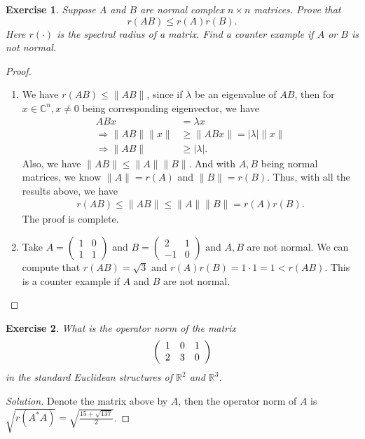 \documentclass[11pt]{book}
\newtheorem{exercise}{Exercise}[section]
\theoremstyle{definition}
\numberwithin{equation}{chapter}
\begin{document}
\medskip

\begin{exercise}
Suppose $A$ and $B$ are normal complex $n\times n$ matrices. Prove that%
$$
r(AB)\leq r(A)r(B).
$$
Here $r(\cdot)$ is the spectral radius of a matrix. Find a counter example if
$A$ or $B$ is not normal.
\end{exercise}
\begin{proof}
~\begin{enumerate}[label=(\alph*)]
    \item We have $r(AB)\leq \|AB\|$, since if $\lambda$ be an eigenvalue of $AB$, then for $x\in\mathbb{C}^n, x\neq 0$ being corresponding eigenvector, we have 
    \begin{align*}
        AB x & = \lambda x \\
        \Rightarrow \|AB\|\|x\| & \geq \|AB x\| = |\lambda|\|x\| \\
        \Rightarrow \|AB\| & \geq |\lambda|.
    \end{align*}
    Also, we have $\|AB\|\leq \|A\| \|B\|$. And with $A, B$ being normal matrices, we know $\|A\| = r(A)$ and $\|B\| = r(B)$. Thus, with all the results above, we have 
    \begin{align*}
        r(AB)\leq \|AB\|\leq \|A\| \|B\| = r(A)r(B).
    \end{align*}
    The proof is complete. 
    \item Take $A = \left(
    \begin{matrix}
        1 & 0\\
        1 & 1
        \end{matrix}
    \right)$ and $B = \left(
    \begin{matrix}
        2 & 1\\
        -1 & 0
    \end{matrix}
    \right)$ and $A,B$ are not normal. We can compute that $r(AB) = \sqrt{3}$ and $r(A)r(B) = 1\cdot 1 = 1 < r(AB)$. This is a counter example if $A$ and $B$ are not normal.
\end{enumerate}
\end{proof}

\medskip

\begin{exercise}
What is the operator norm of the matrix%
$$
\left(
\begin{array}
[c]{ccc}%
1 & 0 & 1\\
2 & 3 & 0
\end{array}
\right)
$$
in the standard Euclidean structures of $\mathbb{R}^{2}$ and $\mathbb{R}^{3}$.
\end{exercise}
\begin{proof}[Solution]
Denote the matrix above by $A$, then the operator norm of $A$ is $\sqrt{r(A^*A)} = \sqrt{\frac{15+\sqrt{137}}{2}}$.
\end{proof}
\end{document}
